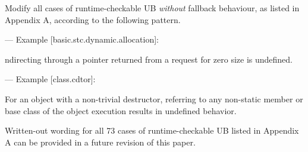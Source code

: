 Modify all cases of runtime-checkable UB \emph{without} fallback behaviour, as listed in Appendix A, according to the following pattern. 

--- Example [basic.stc.dynamic.allocation]:

\begin{adjustwidth}{0.5cm}{0.5cm}
ndirecting through a pointer  returned from a request for zero size is undefined.
\end{adjustwidth}

--- Example [class.cdtor]:

\begin{adjustwidth}{0.5cm}{0.5cm}
For an object with a non-trivial destructor, referring to any non-static member or base class of the object  execution results in undefined behavior.
\end{adjustwidth}

Written-out wording for all 73 cases of runtime-checkable UB listed in Appendix A can be provided in a future revision of this paper.


